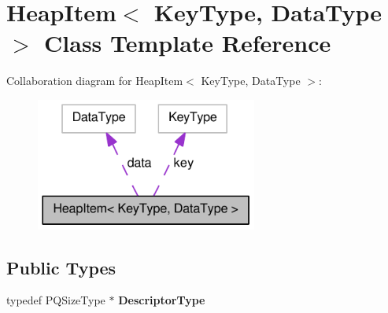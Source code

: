 \hypertarget{class_heap_item}{
\section{HeapItem$<$ KeyType, DataType $>$ Class Template Reference}
\label{class_heap_item}
}


Collaboration diagram for HeapItem$<$ KeyType, DataType $>$:\nopagebreak
\begin{figure}[H]
\begin{center}
\leavevmode
\includegraphics[width=206pt]{class_heap_item__coll__graph}
\end{center}
\end{figure}
\subsection*{Public Types}
\begin{DoxyCompactItemize}
\item 
\hypertarget{class_heap_item_a795b07d10ea5eb947e700ae08e2b5e2b}{
typedef PQSizeType $\ast$ {\bfseries DescriptorType}}
\label{class_heap_item_a795b07d10ea5eb947e700ae08e2b5e2b}

\end{DoxyCompactItemize}
